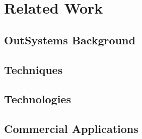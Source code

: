 \chapter{Related Work}
\label{cha:related_work}

\section{OutSystems Background}
\label{sec:outsystems_background}

\section{Techniques}
\label{sec:techniques}

\section{Technologies}
\label{sec:technologies}

\section{Commercial Applications}
\label{sec:commercial_applications}